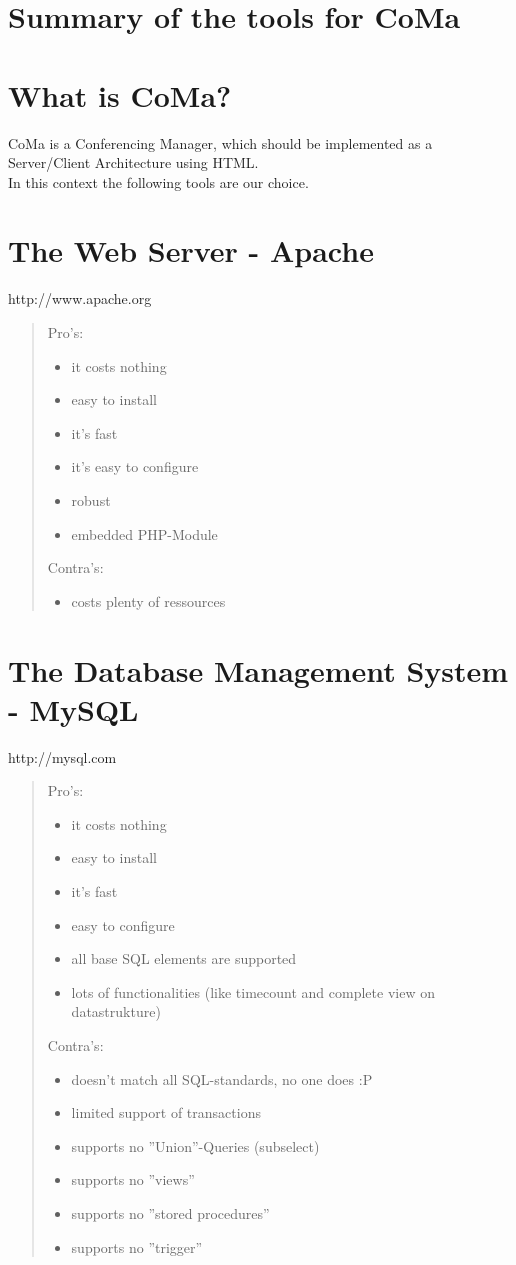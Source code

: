 \documentclass{article}
\begin{document}
\section*{Summary of the tools for CoMa}


\section{What is CoMa?}
CoMa is a Conferencing Manager, which should be implemented as a \\ 
Server/Client Architecture using HTML.\\
In this context the following tools are our choice.\\
\section{The Web Server - Apache}
http://www.apache.org
\begin{quote}
  Pro's:
  \begin{itemize}
    \item it costs nothing
	\item easy to install
	\item it's fast
	\item it's easy to configure
	\item robust
	\item embedded PHP-Module
  \end{itemize}
  Contra's:
  \begin{itemize}
    \item costs plenty of ressources
  \end{itemize}
\end{quote}

\section{The Database Management System - MySQL}
http://mysql.com
\begin{quote}
  Pro's:
  \begin{itemize}
    \item it costs nothing
	\item easy to install
	\item it's fast
	\item easy to configure
	\item all base SQL elements are supported
	\item lots of functionalities (like timecount and complete view on datastrukture)
  \end{itemize}
  Contra's:
  \begin{itemize}
    \item doesn't match all SQL-standards, no one does :P
	\item limited support of transactions  
	\item supports no ''Union''-Queries (subselect)
	\item supports no ''views''
	\item supports no ''stored procedures''
	\item supports no ''trigger''
  \end{itemize}
\end{quote}
\end{document}

